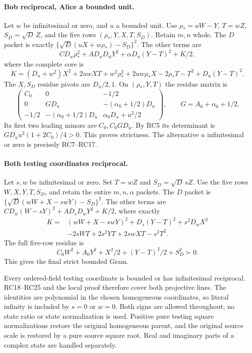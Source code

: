 \paragraph{Bob reciprocal, Alice a bounded unit.}
Let $w$ be infinitesimal or zero, and $u$ a bounded unit. Use
$\rho_*=uW-Y$, $T=wZ$, $S_D=\sqrt D\,Z$, and the five rows
$(\rho_*,Y,X,T,S_D)$. Retain $m,n$ whole. The $D$ packet is
exactly $\{\sqrt D(uX+w\rho_*)-S_D\}^2$. The other terms are
\[
 CD_w\rho_*^2+AD_uD_wY^2+\alpha D_u(Y-T)^2+K/2,
\]
where the complete core is
\[
 K=(D_u+w^2)X^2+2uwX T+w^2\rho_*^2+2uw\rho_*X
                           -2\rho_*T-T^2+D_u(Y-T)^2.
 \tag{RC22}
\]
The $X,S_D$ residue pivots are $D_u/2,1$. On
$(\rho_*,Y,T)$ the residue matrix is
\[
 \begin{pmatrix}
 C_0&0&-1/2\\
 0&G D_u&-(\alpha_0+1/2)D_u\\
 -1/2&-(\alpha_0+1/2)D_u&\alpha_0D_u+u^2/2
 \end{pmatrix},\qquad G=A_0+\alpha_0+1/2.
 \tag{RC23}
\]
Its first two leading minors are $C_0,C_0GD_u$. By RC5 its
determinant is $GD_uu^2(1+2C_0)/4>0$. This proves strictness.
The alternative $u$ infinitesimal or zero is precisely RC7--RC17.

\paragraph{Both testing coordinates reciprocal.}
Let $s,w$ be infinitesimal or zero. Set $T=wZ$ and
$S_D=\sqrt D\,sZ$. Use the five rows $W,X,Y,T,S_D$, and retain the
entire $m,n,\alpha$ packets. The $D$ packet is
$\{\sqrt D(wW+X-swY)-S_D\}^2$. The other terms are
$CD_w(W-sY)^2+AD_sD_wY^2+K/2$, where exactly
\[
\begin{split}
 K={}&(wW+X-swY)^2+D_s(Y-T)^2+s^2D_wX^2\\
 &-2sWT+2s^2YT+2swXT-s^2T^2.
\end{split}\tag{RC24}
\]
The full five-row residue is
\[
 C_0W^2+A_0Y^2+X^2/2+(Y-T)^2/2+S_D^2\succ0.
 \tag{RC25}
\]
This gives the final strict bounded Gram.

Every ordered-field testing coordinate is bounded or has
infinitesimal reciprocal. RC18--RC25 and the local proof therefore
cover both projective lines. The identities are polynomial in the
chosen homogeneous coordinates, so literal infinity is included by
$s=0$ or $w=0$. Both signs are allowed throughout; no state ratio
or state normalization is used. Positive pure testing square
normalizations restore the original homogeneous parent, and the
original source scale is restored by a pure source square root.
Real and imaginary parts of a complex state are handled separately.

